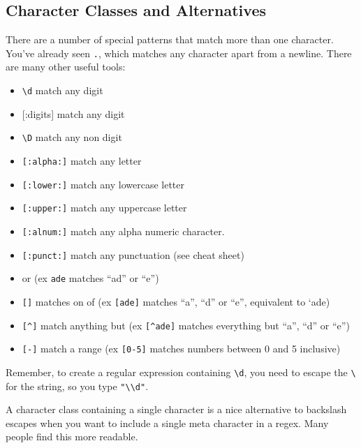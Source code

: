 \documentclass[]{book}
\providecommand{\tightlist}{%
  \setlength{\itemsep}{0pt}\setlength{\parskip}{0pt}}
\theoremstyle{definition}
\theoremstyle{definition}
\theoremstyle{definition}
\theoremstyle{remark}
\let\BeginKnitrBlock\begin \let\EndKnitrBlock\end
\begin{document}
\hypertarget{character-classes-and-alternatives}{%
\subsection{Character Classes and
Alternatives}\label{character-classes-and-alternatives}}

There are a number of special patterns that match more than one
character. You've already seen \texttt{.}, which matches any character
apart from a newline. There are many other useful tools:

\begin{itemize}
\tightlist
\item
  \texttt{\textbackslash{}d} match any digit
\item
  {[}:digits{]} match any digit
\item
  \texttt{\textbackslash{}D} match any non digit
\item
  \texttt{{[}:alpha:{]}} match any letter
\item
  \texttt{{[}:lower:{]}} match any lowercase letter
\item
  \texttt{{[}:upper:{]}} match any uppercase letter
\item
  \texttt{{[}:alnum:{]}} match any alpha numeric character.
\item
  \texttt{{[}:punct:{]}} match any punctuation (see cheat sheet)
\item
  \texttt{\textbar{}} or (ex \texttt{ad\textbar{}e} matches ``ad'' or
  ``e'')
\item
  \texttt{{[}{]}} matches on of (ex \texttt{{[}ade{]}} matches ``a'',
  ``d'' or ``e'', equivalent to `a\textbar{}d\textbar{}e)
\item
  \texttt{{[}\^{}{]}} match anything but (ex \texttt{{[}\^{}ade{]}}
  matches everything but ``a'', ``d'' or ``e'')
\item
  \texttt{{[}-{]}} match a range (ex \texttt{{[}0-5{]}} matches numbers
  between 0 and 5 inclusive)
\end{itemize}

\BeginKnitrBlock{rmdimportant}
Remember, to create a regular expression containing
\texttt{\textbackslash{}d}, you need to escape the
\texttt{\textbackslash{}} for the string, so you type
\texttt{"\textbackslash{}\textbackslash{}d"}.
\EndKnitrBlock{rmdimportant}

A character class containing a single character is a nice alternative to
backslash escapes when you want to include a single meta character in a
regex. Many people find this more readable.
\end{document}
